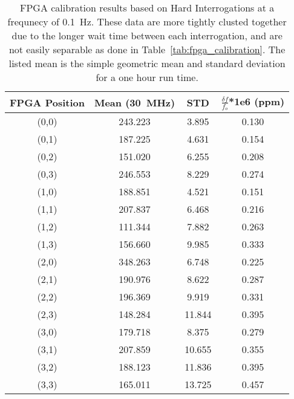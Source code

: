 \begin{table}
	\begin{center}
		\begin{tabular}{|c|c|c|c|}
			\hline
			FPGA Position & Mean (30~\unit{MHz}) & STD & $\frac{\delta f}{f_{o}}$*1e6 (ppm) \\
			\hline
			(0,0) & 243.223 & 3.895 & 0.130 \\
			\hline
			(0,1) & 187.225 & 4.631 & 0.154 \\
			\hline
			(0,2) & 151.020 & 6.255 & 0.208 \\
			\hline
			(0,3) & 246.553 & 8.229 & 0.274 \\
			\hline
			(1,0) & 188.851 & 4.521 & 0.151 \\
			\hline
			(1,1) & 207.837 & 6.468 & 0.216 \\
			\hline
			(1,2) & 111.344 & 7.882 & 0.263 \\
			\hline
			(1,3) & 156.660 & 9.985 & 0.333 \\
			\hline
			(2,0) & 348.263 & 6.748 & 0.225 \\
			\hline
			(2,1) & 190.976 & 8.622 & 0.287 \\
			\hline
			(2,2) & 196.369 & 9.919 & 0.331 \\
			\hline
			(2,3) & 148.284 & 11.844 & 0.395 \\
			\hline
			(3,0) & 179.718 & 8.375 & 0.279 \\
			\hline
			(3,1) & 207.859 & 10.655 & 0.355 \\
			\hline
			(3,2) & 188.123 & 11.836 & 0.395 \\
			\hline
			(3,3) & 165.011 & 13.725 & 0.457 \\
			\hline
		\end{tabular}
	\end{center}
	\caption{FPGA calibration results based on Hard Interrogations at a frequnecy of 0.1~\unit{Hz}.
	These data are more tightly clusted together due to the longer wait time between each interrogation, and are not easily separable as done in Table~\ref{tab:fpga_calibration}.
	The listed mean is the simple geometric mean and standard deviation for a one hour run time.
	}
	\label{tab:fpga_slow_calibration}
\end{table}
